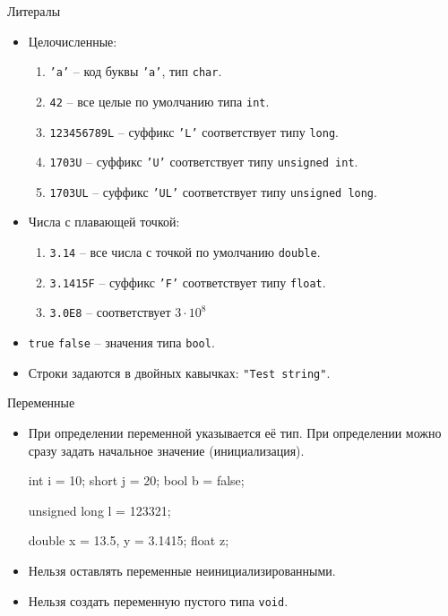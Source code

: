 \documentclass[
    9pt,
    hyperref={pdfencoding=unicode}
    ]{beamer}
\begin{document}
\begin{frame}{Литералы}
    \begin{itemize}
        \item Целочисленные:
        \begin{enumerate}
            \item \texttt{'a'} -- код буквы \texttt{'a'}, тип \texttt{char}.
            \item \texttt{42} -- все целые по умолчанию типа \texttt{int}.
            \item \texttt{123456789L} -- суффикс \texttt{'L'} соответствует типу \texttt{long}.
            \item \texttt{1703U} -- суффикс \texttt{'U'} соответствует типу \texttt{unsigned int}.
            \item \texttt{1703UL} -- суффикс \texttt{'UL'} соответствует типу \texttt{unsigned long}.
        \end{enumerate}
        \item Числа с плавающей точкой:
        \begin{enumerate}
            \item \texttt{3.14} -- все числа с точкой по умолчанию \texttt{double}.
            \item \texttt{3.1415F} -- суффикс \texttt{'F'} соответствует типу \texttt{float}.
            \item \texttt{3.0E8} -- соответствует  $ 3\cdot10^8 $
        \end{enumerate}
        \item \texttt{true} \texttt{false} -- значения типа \texttt{bool}.
        \item Строки задаются в двойных кавычках: \texttt{"Test string"}.
    \end{itemize}
\end{frame}

\begin{frame}[fragile]{Переменные}
    \begin{itemize}
        \item При определении переменной указывается её тип. При определении можно сразу задать начальное значение (инициализация).
        \begin{cppcode}
            int i = 10;
            short j = 20;
            bool b = false;
            
            unsigned long l = 123321;
            
            double x = 13.5, y = 3.1415;
            float z;
        \end{cppcode}
    \item Нельзя оставлять переменные неинициализированными.
    \item Нельзя создать переменную пустого типа \texttt{void}.
    \end{itemize}
\end{frame}
\end{document}
